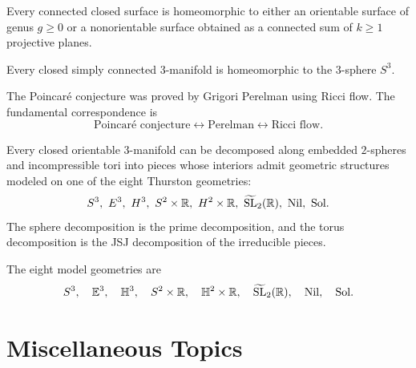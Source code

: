     \begin{theorem}
        Every connected closed surface is homeomorphic to either an orientable
        surface of genus $g\geq 0$ or a nonorientable surface obtained as a
        connected sum of $k\geq 1$ projective planes.
    \end{theorem}

    \begin{theorem}
        Every closed simply connected $3$-manifold is homeomorphic to the
        $3$-sphere $S^3$.
    \end{theorem}

    \begin{remark}
        The Poincaré conjecture was proved by Grigori Perelman using Ricci flow.
        The fundamental correspondence is
        \[
            \text{Poincaré conjecture} \longleftrightarrow
            \text{Perelman} \longleftrightarrow
            \text{Ricci flow}.
        \]
    \end{remark}

    \begin{theorem}
        Every closed orientable $3$-manifold can be decomposed along embedded
        $2$-spheres and incompressible tori into pieces whose interiors admit
        geometric structures modeled on one of the eight Thurston geometries:
        \[
            S^3,\ E^3,\ H^3,\ S^2\times\R,\ H^2\times\R,
            \ \widetilde{\SL}_2(\R),\ \mathrm{Nil},\ \mathrm{Sol}.
        \]
        The sphere decomposition is the prime decomposition, and the torus
        decomposition is the JSJ decomposition of the irreducible pieces.
    \end{theorem}

    \begin{fact}
        The eight model geometries are
        \[
            S^3,
            \quad \mathbb{E}^3,
            \quad \mathbb{H}^3,
            \quad S^2\times\mathbb{R},
            \quad \mathbb{H}^2\times\mathbb{R},
            \quad \widetilde{\operatorname{SL}}_2(\mathbb{R}),
            \quad \mathrm{Nil},
            \quad \mathrm{Sol}.
        \]
    \end{fact}

    \chapter{Miscellaneous Topics}

    \relatedcourses{}


